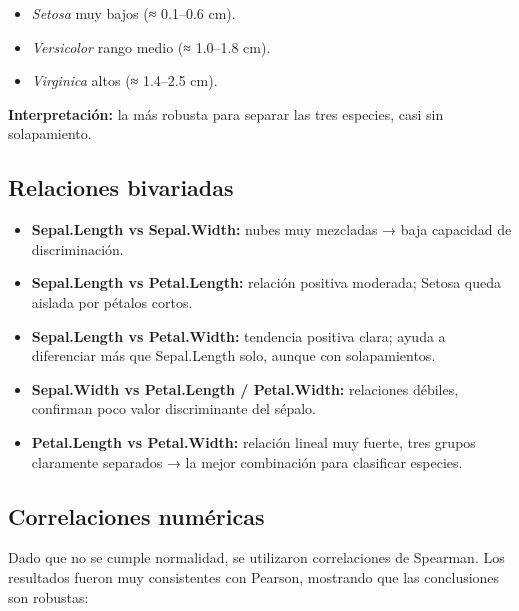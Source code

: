 \documentclass[
  spanish,
  11pt,
  a4paper,
  DIV=11,
  numbers=noendperiod]{scrartcl}
\providecommand{\tightlist}{%
  \setlength{\itemsep}{0pt}\setlength{\parskip}{0pt}}
\begin{document}
\begin{itemize}
  \begin{itemize}
  \tightlist
  \item
    \emph{Setosa} muy bajos (≈ 0.1--0.6 cm).\\
  \item
    \emph{Versicolor} rango medio (≈ 1.0--1.8 cm).\\
  \item
    \emph{Virginica} altos (≈ 1.4--2.5 cm).
  \end{itemize}

  \textbf{Interpretación:} la más robusta para separar las tres
  especies, casi sin solapamiento.
\end{itemize}

\subsection{Relaciones bivariadas}\label{relaciones-bivariadas}

\begin{itemize}
\tightlist
\item
  \textbf{Sepal.Length vs Sepal.Width:} nubes muy mezcladas → baja
  capacidad de discriminación.\\
\item
  \textbf{Sepal.Length vs Petal.Length:} relación positiva moderada;
  Setosa queda aislada por pétalos cortos.\\
\item
  \textbf{Sepal.Length vs Petal.Width:} tendencia positiva clara; ayuda
  a diferenciar más que Sepal.Length solo, aunque con solapamientos.\\
\item
  \textbf{Sepal.Width vs Petal.Length / Petal.Width:} relaciones
  débiles, confirman poco valor discriminante del sépalo.\\
\item
  \textbf{Petal.Length vs Petal.Width:} relación lineal muy fuerte, tres
  grupos claramente separados → la mejor combinación para clasificar
  especies.
\end{itemize}

\subsection{Correlaciones numéricas}\label{correlaciones-numuxe9ricas}

Dado que no se cumple normalidad, se utilizaron correlaciones de
Spearman. Los resultados fueron muy consistentes con Pearson, mostrando
que las conclusiones son robustas:
\end{document}
